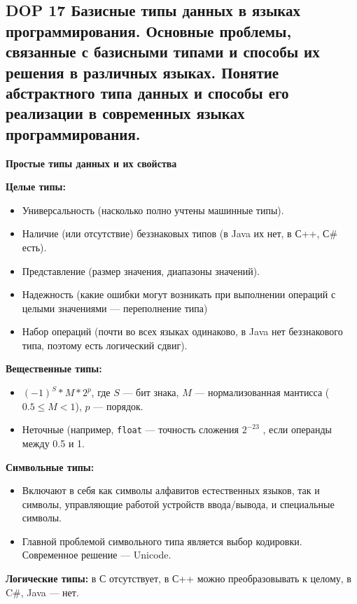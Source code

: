 \subsection{DOP 17 Базисные типы данных в языках программирования. Основные проблемы, связанные с базисными типами и способы их решения в различных языках. Понятие абстрактного типа данных и способы его реализации в современных языках программирования.}

\textbf{Простые типы данных и их свойства}

\textbf{Целые типы:}
\begin{itemize}
    \item Универсальность (насколько полно учтены машинные типы).
    \item Наличие (или отсутствие) беззнаковых типов (в Java их нет, в С++, С\# есть).
    \item Представление (размер значения, диапазоны значений).
    \item Надежность (какие ошибки могут возникать при выполнении операций с целыми значениями --- переполнение типа)
    \item Набор операций (почти во всех языках одинаково, в Java нет беззнакового типа, поэтому есть логический сдвиг).
\end{itemize}

\textbf{Вещественные типы:}
\begin{itemize}
    \item $(-1)^S \ast M \ast 2^p$, где $S$ --- бит знака, $M$ --- нормализованная мантисса ($0.5 \leq M < 1$), $p$ --- порядок.
    \item Неточные (например, \texttt{float} --- точность сложения $2^{-23}$ , если операнды между 0.5 и 1.
\end{itemize}

\textbf{Символьные типы:}
\begin{itemize}
    \item Включают в себя как символы алфавитов естественных языков, так и символы, управляющие работой устройств ввода/вывода, и специальные символы.
    \item Главной проблемой символьного типа является выбор кодировки.
    Современное решение --- Unicode.
\end{itemize}

\textbf{Логические типы:} в С отсутствует, в С++ можно преобразовывать к целому, в C\#, Java --- нет.

